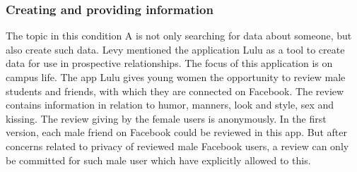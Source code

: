 \subsubsection{Creating and providing information}
The topic in this condition A is not only searching for data about someone, but also create such data. Levy \cite{levy2014intimate} mentioned the application Lulu as a tool to create data for use in prospective relationships. The focus of this application is on campus life. The app Lulu gives young women the opportunity to review male students and friends, with which they are connected on Facebook. The review contains information in relation to humor, manners, look and style, sex and kissing. The review giving by the female users is anonymously. In the first version, each male friend on Facebook could be reviewed in this app. But after concerns related to privacy of reviewed male Facebook users, a review can only be committed for such male user which have explicitly allowed to this.

